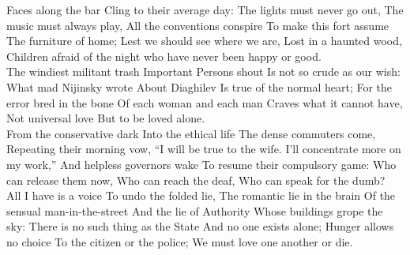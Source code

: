 \begin{poem}
                             Faces along the bar
                             Cling to their average day:
                             The lights must never go out,
                             The music must always play,
                             All the conventions conspire
                             To make this fort assume
                             The furniture of home;
                             Lest we should see where we are,
                             Lost in a haunted wood,
                             Children afraid of the night
                             who have never been happy or good.\\

                             The windiest militant trash
                             Important Persons shout
                             Is not so crude as our wish:
                             What mad Nijinsky wrote
                             About Diaghilev
                             Is true of the normal heart;
                             For the error bred in the bone
                             Of each woman and each man
                             Craves what it cannot have,
                             Not universal love
                             But to be loved alone.\\

                             From the conservative dark
                             Into the ethical life
                             The dense commuters come,
                             Repeating their morning vow,
                             ``I will be true to the wife.
                             I'll concentrate more on my work,''
                             And helpless governors wake
                             To resume their compulsory game:
                             Who can release them now,
                             Who can reach the deaf,
                             Who can speak for the dumb?\\

                             All I have is a voice
                             To undo the folded lie,
                             The romantic lie in the brain
                             Of the sensual man-in-the-street
                             And the lie of Authority
                             Whose buildings grope the sky:
                             There is no such thing as the State
                             And no one exists alone;
                             Hunger allows no choice
                             To the citizen or the police;
                             We must love one another or die.\\


\end{poem}
